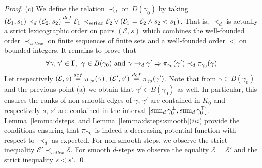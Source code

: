 \begin{proof}
  (c) We define the relation $\prec_d$ on $D(\gamma_0)$ by taking
  $(\mathcal{E}_1,s_1) \prec_d (\mathcal{E}_2,s_2) \stackrel{def}=
  \mathcal{E}_1 \prec_{setlex} \mathcal{E}_2 \vee (\mathcal{E}_1 =
  \mathcal{E}_2 \wedge s_2 < s_1)$.  That is, $\prec_d$ is actually a
  strict lexicographic order on pairs $(\mathcal{E},s)$ which combines
  the well-founded order $\prec_{setlex}$ on finite sequences of
  finite sets and a well-founded order $<$ on bounded integers.  It
  remains to prove that $$\forall \gamma,\gamma'\in\Gamma, ~ \gamma \in
  B(\gamma_0) \mbox{ and } \gamma \rightarrow_d \gamma' \Rightarrow
  \pi_{\gamma_0}(\gamma') \prec_d \pi_{\gamma_0}(\gamma)$$ Let
  respectively $(\mathcal{E},s) \stackrel{def}= \pi_{\gamma_0}(\gamma)$,
  $(\mathcal{E}',s') \stackrel{def}= \pi_{\gamma_0}(\gamma')$. Note that from
  $\gamma \in B(\gamma_0)$ and the previous point (a) we obtain that
  $\gamma' \in B(\gamma_0)$ as well.  In particular, this ensures the
  ranks of non-smooth edges of $\gamma$, $\gamma'$ are contained in
  $K_0$ and respectively $s$, $s'$ are contained in the interval
  $[\mathop{\mathrm{sum}_d} \gamma_0^{\bot}, \mathop{\mathrm{sum}_d}\gamma_0^{\top}]$.
  Lemma~\ref{lemma:dsteps} and Lemma~\ref{lemma:dsteps:smooth}($iii$)
  provide the conditions ensuring that $\pi_{\gamma_0}$ is indeed a
  decreasing potential function with respect to $\prec_d$ as expected.
  For non-smooth steps, we observe the strict inequality $\mathcal{E}'
  \prec_{setlex} \mathcal{E}$. For smooth $d$-steps we observe the
  equality ${\mathcal E} = \mathcal{E}'$ and the strict inequality $s
  < s'$. \qed
\end{proof}


